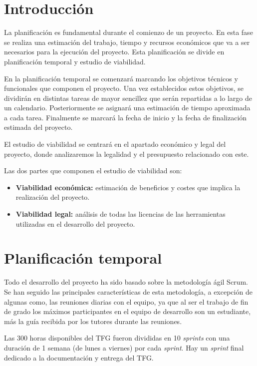 
\section{Introducción}

La planificación es fundamental durante el comienzo de un proyecto. En esta fase se realiza una estimación del trabajo, tiempo y recursos económicos que va a ser necesarios para la ejecución del proyecto. Esta planificación se divide en planificación temporal y estudio de viabilidad.

En la planificación temporal se comenzará marcando los objetivos técnicos y funcionales que componen el proyecto. Una vez establecidos estos objetivos, se dividirán en distintas tareas de mayor sencillez que serán repartidas a lo largo de un calendario. Posteriormente se asignará una estimación de tiempo aproximada a cada tarea. Finalmente se marcará la fecha de inicio y la fecha de finalización estimada del proyecto.

El estudio de viabilidad se centrará en el apartado económico y legal del proyecto, donde analizaremos la legalidad y el presupuesto relacionado con este.

Las dos partes que componen el estudio de viabilidad son:
\begin{itemize}
    \item \textbf{Viabilidad económica:} estimación de beneficios y costes que implica la realización del proyecto.
    \item \textbf{Viabilidad legal:} análisis de todas las licencias de las herramientas utilizadas en el desarrollo del proyecto.
\end{itemize}
\section{Planificación temporal}

Todo el desarrollo del proyecto ha sido basado sobre la metodología ágil Scrum. Se han seguido las principales características de esta metodología, a excepción de algunas como, las reuniones diarias con el equipo, ya que al ser el trabajo de fin de grado los máximos participantes en el equipo de desarrollo son un estudiante, más la guía recibida por los tutores durante las reuniones.

Las 300 horas disponibles del TFG fueron divididas en 10 \textit{sprints} con una duración de 1 semana (de lunes a viernes) por cada \textit{sprint}. Hay un \textit{sprint} final dedicado a la documentación y entrega del TFG.

